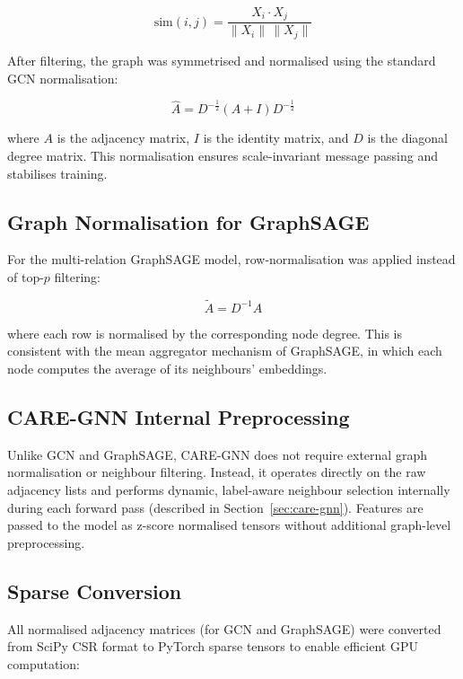 \begin{equation}
\text{sim}(i,j) = \frac{X_i \cdot X_j}{\|X_i\| \, \|X_j\|}
\end{equation}

After filtering, the graph was symmetrised and normalised using the standard GCN normalisation:

\begin{equation}
\hat{A} = D^{-\frac{1}{2}} (A + I) D^{-\frac{1}{2}}
\end{equation}

where \( A \) is the adjacency matrix, \( I \) is the identity matrix, and \( D \) is the diagonal degree matrix. This normalisation ensures scale-invariant message passing and stabilises training.

\subsection{Graph Normalisation for GraphSAGE}
For the multi-relation GraphSAGE model, row-normalisation was applied instead of top-\(p\) filtering:

\begin{equation}
\tilde{A} = D^{-1} A
\end{equation}

where each row is normalised by the corresponding node degree. This is consistent with the mean aggregator mechanism of GraphSAGE, in which each node computes the average of its neighbours' embeddings.

\subsection{CARE-GNN Internal Preprocessing}
Unlike GCN and GraphSAGE, CARE-GNN does not require external graph normalisation or neighbour filtering. Instead, it operates directly on the raw adjacency lists and performs dynamic, label-aware neighbour selection internally during each forward pass (described in Section~\ref{sec:care-gnn}). Features are passed to the model as z-score normalised tensors without additional graph-level preprocessing.

\subsection{Sparse Conversion}
All normalised adjacency matrices (for GCN and GraphSAGE) were converted from SciPy CSR format to PyTorch sparse tensors to enable efficient GPU computation:

